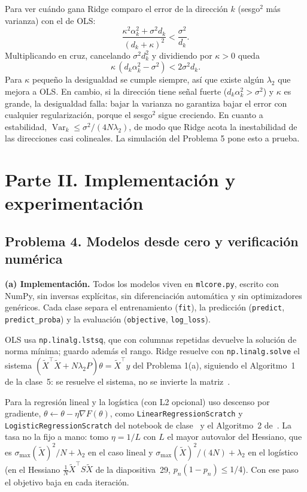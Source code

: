 \documentclass[10pt,a4paper]{article}
\newcommand{\Xt}{\tilde X}
\begin{document}
Para ver cuándo gana Ridge comparo el error de la dirección $k$ (sesgo$^2$ más varianza) con el de OLS:
\[ \frac{\kappa^2\alpha_k^2+\sigma^2d_k}{(d_k+\kappa)^2}<\frac{\sigma^2}{d_k}. \]
Multiplicando en cruz, cancelando $\sigma^2d_k^2$ y dividiendo por $\kappa>0$ queda
\[ \kappa\,(d_k\alpha_k^2-\sigma^2)<2\sigma^2d_k . \]
Para $\kappa$ pequeño la desigualdad se cumple siempre, así que existe algún $\lambda_2$ que mejora a OLS. En cambio, si la dirección tiene señal fuerte ($d_k\alpha_k^2>\sigma^2$) y $\kappa$ es grande, la desigualdad falla: bajar la varianza no garantiza bajar el error con cualquier regularización, porque el sesgo$^2$ sigue creciendo. En cuanto a estabilidad, $\operatorname{Var}_k\le\sigma^2/(4N\lambda_2)$, de modo que Ridge acota la inestabilidad de las direcciones casi colineales. La simulación del Problema 5 pone esto a prueba.

\section*{Parte II. Implementación y experimentación}

\subsection*{Problema 4. Modelos desde cero y verificación numérica}
\textbf{(a) Implementación.}
Todos los modelos viven en \texttt{mlcore.py}, escrito con NumPy, sin inversas explícitas, sin diferenciación automática y sin optimizadores genéricos. Cada clase separa el entrenamiento (\texttt{fit}), la predicción (\texttt{predict}, \texttt{predict\_proba}) y la evaluación (\texttt{objective}, \texttt{log\_loss}).

OLS usa \texttt{np.linalg.lstsq}, que con columnas repetidas devuelve la solución de norma mínima; guardo además el rango. Ridge resuelve con \texttt{np.linalg.solve} el sistema $(\Xt^\top\Xt+N\lambda_2P)\theta=\Xt^\top y$ del Problema 1(a), siguiendo el Algoritmo~1 de la clase~5: se resuelve el sistema, no se invierte la matriz~\cite{clase5}.

Para la regresión lineal y la logística (con L2 opcional) uso descenso por gradiente, $\theta\leftarrow\theta-\eta\nabla F(\theta)$, como \texttt{LinearRegressionScratch} y \texttt{LogisticRegressionScratch} del notebook de clase~\cite{nbreg} y el Algoritmo~2 de~\cite{clase5}. La tasa no la fijo a mano: tomo $\eta=1/L$ con $L$ el mayor autovalor del Hessiano, que es $\sigma_{\max}(\Xt)^2/N+\lambda_2$ en el caso lineal y $\sigma_{\max}(\Xt)^2/(4N)+\lambda_2$ en el logístico (en el Hessiano $\frac1N\Xt^\top S\Xt$ de la diapositiva~29, $p_n(1-p_n)\le1/4$). Con ese paso el objetivo baja en cada iteración.
\end{document}
